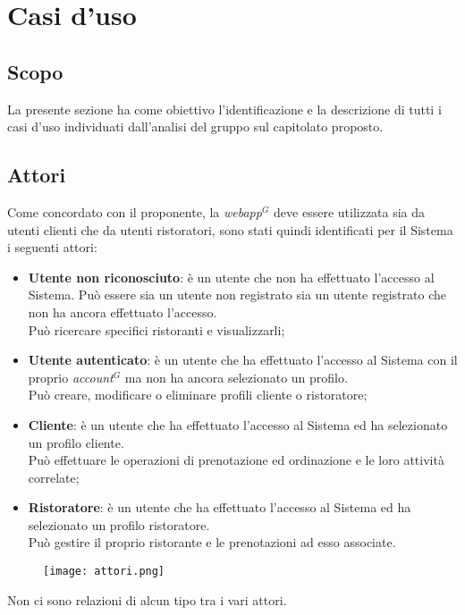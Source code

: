 \nonstopmode
\section{Casi d'uso}
\subsection{Scopo}

La presente sezione ha come obiettivo l'identificazione e la descrizione di tutti i casi d'uso individuati dall'analisi del gruppo sul capitolato proposto.

\subsection{Attori}
Come concordato con il proponente, la \emph{webapp}$^{G}$ deve essere utilizzata sia da utenti clienti che da utenti ristoratori, sono stati quindi identificati per il Sistema i seguenti attori:

\begin{itemize}
\item \textbf{Utente non riconosciuto}: è un utente che non ha effettuato l'accesso al Sistema. Può essere sia un utente non registrato sia un utente registrato che non ha ancora effettuato l'accesso.\\ Può ricercare specifici ristoranti e visualizzarli;
\item \textbf{Utente autenticato}: è un utente che ha effettuato l'accesso al Sistema con il proprio \emph{account}$^{G}$ ma non ha ancora selezionato un profilo.\\ Può creare, modificare o eliminare profili cliente o ristoratore;
\item \textbf{Cliente}: è un utente che ha effettuato l'accesso al Sistema ed ha selezionato un profilo cliente.\\ Può effettuare le operazioni di prenotazione ed ordinazione e le loro attività correlate;
\item \textbf{Ristoratore}: è un utente che ha effettuato l'accesso al Sistema ed ha selezionato un profilo ristoratore.\\ Può gestire il proprio ristorante e le prenotazioni ad esso associate.
\end{itemize}
\begin{figure}[h] \texttt{[image: attori.png]} \end{figure}

Non ci sono relazioni di alcun tipo tra i vari attori.

